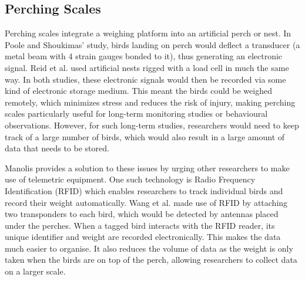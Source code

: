 \documentclass[class=report,11pt,crop=false]{standalone}
\begin{document}
\subsection{Perching Scales}
Perching scales integrate a weighing platform into an artificial perch or nest. In Poole and Shoukimas’ \cite{poole1982scale} study, birds landing on perch would deflect a transducer (a metal beam with 4 strain gauges bonded to it), thus generating an electronic signal. Reid et al. \cite{reid1999measurement} used artificial nests rigged with a load cell in much the same way. In both studies, these electronic signals would then be recorded via some kind of electronic storage medium. This meant the birds could be weighed remotely, which minimizes stress and reduces the risk of injury, making perching scales particularly useful for long-term monitoring studies or behavioural observations. However, for such long-term studies, researchers would need to keep track of a large number of birds, which would also result in a large amount of data that needs to be stored.

Manolis \cite{manoils2024simple} provides a solution to these issues by urging other researchers to make use of telemetric equipment. One such technology is Radio Frequency Identification (RFID) which enables researchers to track individual birds and record their weight automatically. Wang et al. \cite{wang2019rfid} made use of RFID by attaching two transponders to each bird, which would be detected by antennas placed under the perches. When a tagged bird interacts with the RFID reader, its unique identifier and weight are recorded electronically. This makes the data much easier to organise. It also reduces the volume of data as the weight is only taken when the birds are on top of the perch, allowing researchers to collect data on a larger scale. 

\pagebreak
\end{document}
